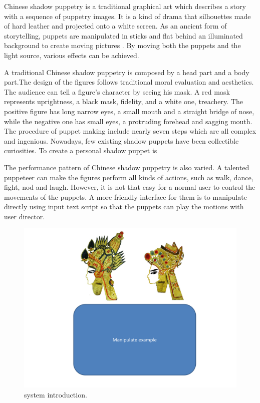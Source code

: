 \documentclass[letter]{sig-alternate}
\begin{document}
Chinese shadow puppetry is a traditional graphical art which describes a story with a sequence of puppetry images. It is a kind of drama that silhouettes made of hard leather and projected onto a white screen. As an ancient form of storytelling, puppets are manipulated in sticks and flat behind an illuminated background to create moving pictures \cite{chen2012visions}. By moving both the puppets and the light source, various effects can be achieved. 

A traditional Chinese shadow puppetry is composed by a head part and a body part.The design of the figures follows traditional moral evaluation and aesthetics. The audience can tell a figure's character by seeing his mask. A red mask represents uprightness, a black mask, fidelity, and a white one, treachery. The positive figure has long narrow eyes, a small mouth and a straight bridge of nose, while the negative one has small eyes, a protruding forehead and sagging mouth. The procedure of puppet making include nearly seven steps which are all complex and ingenious. Nowadays, few existing shadow puppets have been collectible curiosities. To create a personal shadow puppet is 

The performance pattern of Chinese shadow puppetry is also varied. A talented puppeteer can make the figures perform all kinds of actions, such as walk, dance, fight, nod and laugh. However, it is not that easy for a normal user to control the movements of the puppets. A more friendly interface for them is to manipulate directly using input text script so that the puppets can play the motions with user director.





\begin{figure}[t]
\begin{center}
\includegraphics[scale=0.4]{figure/SyetemIntro.pdf}
\caption{\small{system introduction.}}
\label{fig:firstfig}
\end{center}
\end{figure}
\end{document}
